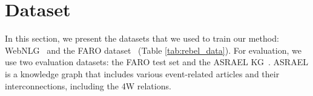 \documentclass[
]{ceurart}
\begin{document}
\section{Dataset}
\label{sec:dataset}
In this section, we present the datasets that we used to train our method: WebNLG~\cite{WebNLG} and the FARO dataset~\cite{sem_data_aug} (Table \ref{tab:rebel_data}). For evaluation, we use two evaluation datasets: the FARO test set and the ASRAEL KG~\cite{ASRAEL}. ASRAEL is a knowledge graph that includes various event-related articles and their interconnections, including the 4W relations.

\begin{table}[htbp]
	\caption{Sample of the FARO dataset.}
	\label{tab:rebel_data}

\end{table}
\end{document}
